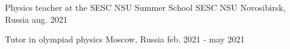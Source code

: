 

\begin{cventries}


\cventry
{Physics teacher at the SESC NSU Summer School}
{SESC NSU}
{Novosibirsk, Russia}
{aug. 2021}
{}


\cventry
{Tutor in olympiad physics} %
{} %
{Moscow, Russia} %
{feb. 2021 - may 2021} %
{}



\end{cventries}
